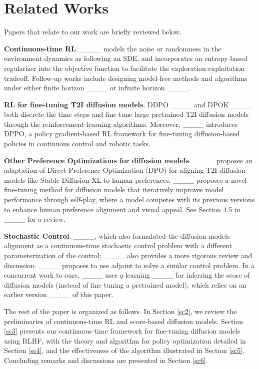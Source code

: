 \section{Related Works}
Papers that relate to our work are briefly reviewed below.

\textbf{Continuous-time RL}. ____ models the noise or randomness in the environment dynamics as following an SDE, and incorporates an entropy-based regularizer into the objective function to facilitate the exploration-exploitation tradeoff. Follow-up works include designing model-free methods and algorithms under either finite horizon ____ or infinite horizon ____. 

\textbf{RL for fine-tuning T2I diffusion models}. DDPO ____ and DPOK ____ both discrete the time steps and fine-tune large pretrained T2I diffusion models through the reinforcement learning algorithms. Moreover, ____ introduces DPPO, a policy gradient-based RL framework for fine-tuning diffusion-based policies in continuous control and robotic tasks.

\textbf{Other Preference Optimizations for diffusion models}. ____ proposes an adaptation of Direct Preference Optimization (DPO) for aligning T2I diffusion models like Stable Diffusion XL to human preferences. 
____ proposes a novel fine-tuning method for diffusion models that iteratively improves model performance through self-play, where a model competes with its previous versions to enhance human preference alignment and visual appeal. 
See Section 4.5 in ____ for a review.

\textbf{Stochastic Control}. ____, which also formulated the diffusion models alignment as a continuous-time stochastic control problem with a different parameterization of the control; ____ also provides a more rigorous review and discussion. ____ proposes to use adjoint to solve a similar control problem. 
In a concurrent work to ours,  
____ uses $q$-learning ____ for inferring the score of diffusion models 
(instead of fine tuning a pretrained model),
which relies on an earlier version ____ of this paper.

The rest of the paper is organized as follows. In Section \ref{sc2}, we review the preliminaries of continuous-time RL and score-based diffusion models. Section \ref{sc3} presents our continuous-time  framework for fine-tuning diffusion models using RLHF, with the theory and algorithm for policy optimization detailed in Section \ref{sc4}, and the effectiveness of the algorithm illustrated in Section \ref{sc5}. Concluding remarks and discussions are presented in Section \ref{sc6}.